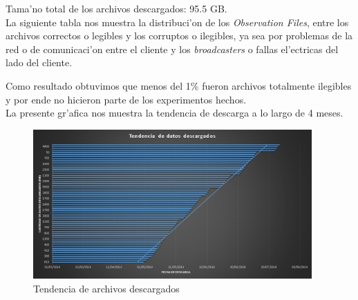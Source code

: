 Tama'no total de los archivos descargados: 95.5 GB.\\

La siguiente tabla nos muestra la distribuci'on de los \emph{Observation Files}, entre los archivos correctos o legibles y los corruptos o ilegibles, ya sea por problemas de la red o de comunicaci'on entre el cliente y los \emph{broadcasters} o fallas el'ectricas del lado del cliente.

\begin{table}[H]
\begin{center}
\end{center}
\caption{Distribuci'on de los \emph{Observation Files} }
\end{table}

Como resultado obtuvimos que menos del 1\% fueron archivos totalmente ilegibles y por ende no hicieron parte de los experimentos hechos.\\

La presente gr'afica nos muestra la tendencia de descarga a lo largo de 4 meses.

\begin{figure}[H]
\centering
\includegraphics[width=0.95\textwidth]{images/Tendencia_Datos_Descargados}
\caption{Tendencia de archivos descargados}
\label{fig:6.1}
\end{figure}

